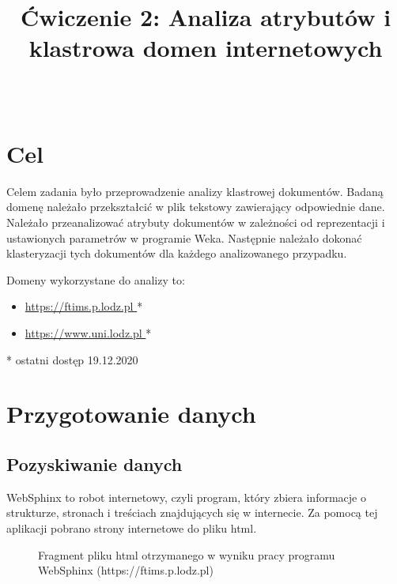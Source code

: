 \documentclass{classrep}
\author{%
  \studentinfo{Paweł Jeziorski}{234066}\\
  \studentinfo{Karol Podlewski}{234106}%
}
\title{Ćwiczenie 2: Analiza atrybutów i klastrowa domen internetowych}
\begin{document}
\maketitle


\tableofcontents
{}
\newpage

\section{Cel}

Celem zadania było przeprowadzenie analizy klastrowej dokumentów. Badaną domenę należało przekształcić w plik tekstowy zawierający odpowiednie dane.
Należało przeanalizować atrybuty dokumentów w zależności od reprezentacji i ustawionych parametrów w programie Weka. Następnie należało dokonać klasteryzacji tych dokumentów dla każdego analizowanego przypadku.

Domeny wykorzystane do analizy to:
\begin{itemize}
  \item \href{https://ftims.p.lodz.pl}{https://ftims.p.lodz.pl }*
  \item \href{https://www.uni.lodz.pl}{https://www.uni.lodz.pl }*
\end{itemize}


* ostatni dostęp 19.12.2020

\section{Przygotowanie danych}

    \subsection{Pozyskiwanie danych}
    
    WebSphinx to robot internetowy, czyli program, który zbiera informacje o strukturze, stronach i treściach znajdujących się w internecie. Za pomocą tej aplikacji  pobrano strony internetowe do pliku html. 


    \begin{figure}[H] 
    	\begin{center}
        \caption{Fragment pliku html otrzymanego w wyniku pracy programu WebSphinx (https://ftims.p.lodz.pl) }
    	\end{center}
    \end{figure}
    
\end{document}
